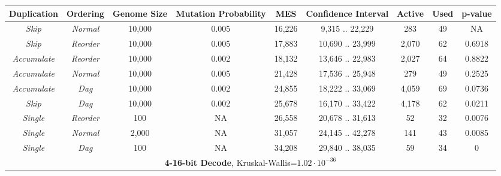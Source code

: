 \documentclass[journal]{IEEEtran}
\begin{document}
\begin{table}
\begin{tabular}{|c|c|c|c|c|c|c|c|c|}
\textbf{Duplication} & \textbf{Ordering} & \textbf{Genome Size} & \textbf{Mutation Probability} & \textbf{MES} & \textbf{Confidence Interval} & \textbf{Active} & \textbf{Used} & \textbf{p-value} \\ \hline
\rowcolor{Gray}
\emph{Skip} & \emph{Normal}        & 10,000 & 0.005 & 16,226 & 9,315 .. 22,229  &   283 & 49 & NA \\ \hline
\emph{Skip} & \emph{Reorder}       & 10,000 & 0.005 & 17,883 & 10,690 .. 23,999 & 2,070 & 62 & 0.6918 \\ \hline
\emph{Accumulate} & \emph{Reorder} & 10,000 & 0.002 & 18,132 & 13,646 .. 22,983 & 2,027 & 64 & 0.8822 \\ \hline
\emph{Accumulate} & \emph{Normal}  & 10,000 & 0.005 & 21,428 & 17,536 .. 25,948 &   279 & 49 & 0.2525 \\ \hline
\emph{Accumulate} & \emph{Dag}     & 10,000 & 0.002 & 24,855 & 18,222 .. 33,069 & 4,059 & 69 & 0.0736 \\ \hline
\emph{Skip} & \emph{Dag}           & 10,000 & 0.002 & 25,678 & 16,170 .. 33,422 & 4,178 & 62 & 0.0211 \\ \hline
\emph{Single} & \emph{Reorder}     & 100    & NA    & 26,558 & 20,678 .. 31,613 &    52 & 32 & 0.0076 \\ \hline
\emph{Single} & \emph{Normal}      & 2,000  & NA    & 31,057 & 24,145 .. 42,278 &   141 & 43 & 0.0085 \\ \hline
\emph{Single} & \emph{Dag}         & 100    & NA    & 34,208 & 29,840 .. 38,035 &    59 & 34 & 0 \\ \hline\hline

	  \multicolumn{9}{|c|}{\textbf{4-16-bit Decode}, Kruskal-Wallis=$1.02\cdot 10^{-36}$} \\ \hline



\end{tabular}
\end{table}
\end{document}
